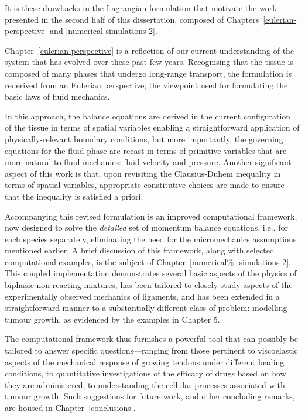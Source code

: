It is these drawbacks in the Lagrangian formulation that motivate the
work presented in the second half of this dissertation, composed of
Chapters~\ref{eulerian-perspective} and \ref{numerical-simulations-2}.

Chapter~\ref{eulerian-perspective} is a reflection of our current
understanding of the system that has evolved over these past few
years. Recognising that the tissue is composed of many phases that
undergo long-range transport, the formulation is rederived from an
Eulerian perspective; the viewpoint used for formulating the basic
laws of fluid mechanics.

In this approach, the balance equations are derived in the current
configuration of the tissue in terms of spatial variables enabling a
straightforward application of physically-relevant boundary
conditions, but more importantly, the governing equations for the
fluid phase are recast in terms of primitive variables that are more
natural to fluid mechanics: fluid velocity and pressure. Another
significant aspect of this work is that, upon revisiting the
Clausius-Duhem inequality in terms of spatial variables, appropriate
constitutive choices are made to ensure that the inequality is
satisfied a priori.

Accompanying this revised formulation is an improved computational
framework, now designed to solve the {\em detailed} set of momentum
balance equations, i.e., for each species separately, eliminating the
need for the micromechanics assumptions mentioned earlier. A brief
discussion of this framework, along with selected computational
examples, is the subject of Chapter~\ref{numerical%
  -simulations-2}. This coupled implementation demonstrates several
basic aspects of the physics of biphasic non-reacting mixtures, has
been tailored to closely study aspects of the experimentally observed
mechanics of ligaments, and has been extended in a straightforward
manner to a substantially different class of problem: modelling tumour
growth, as evidenced by the examples in Chapter 5.

The computational framework thus furnishes a powerful tool that can
possibly be tailored to answer specific questions---ranging from those
pertinent to viscoelastic aspects of the mechanical response of
growing tendons under different loading conditions, to quantitative
investigations of the efficacy of drugs based on how they are
administered, to understanding the cellular processes associated with
tumour growth. Such suggestions for future work, and other concluding
remarks, are housed in Chapter~\ref{conclusions}.

